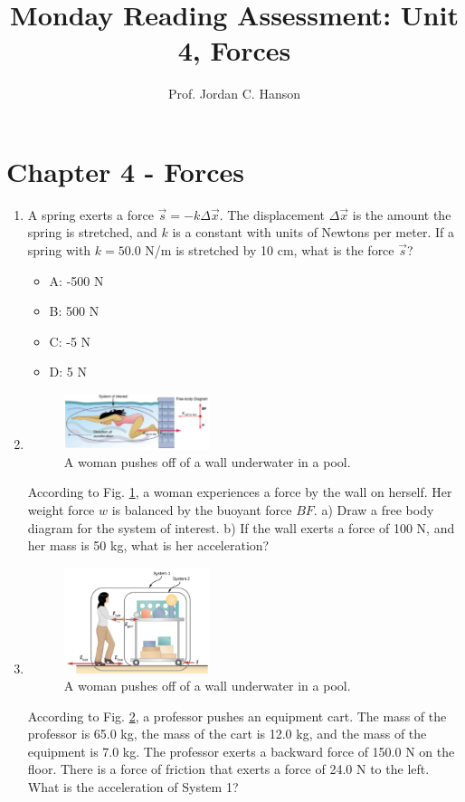 \documentclass{article}
\begin{document}
\title{Monday Reading Assessment: Unit 4, Forces}
\author{Prof. Jordan C. Hanson}

\maketitle

\section{Chapter 4 - Forces}

\begin{enumerate}
\item A spring exerts a force $\vec{s} = -k \Delta\vec{x}$.  The displacement $\Delta\vec{x}$ is the amount the spring is stretched, and $k$ is a constant with units of Newtons per meter.  If a spring with $k = 50.0$ N/m is stretched by 10 cm, what is the force $\vec{s}$?
\begin{itemize}
\item A: -500 N
\item B: 500 N
\item C: -5 N
\item D: 5 N
\end{itemize}
\item 
\begin{figure}[ht]
\centering
\includegraphics[width=0.4\textwidth,trim=0cm 0cm 4.75cm 2cm,clip=true]{wall.png}
\caption{\label{fig:wall} A woman pushes off of a wall underwater in a pool.}
\end{figure}
According to Fig. \ref{fig:wall}, a woman experiences a force by the wall on herself.  Her weight force $w$ is balanced by the buoyant force $BF$.  a) Draw a free body diagram for the system of interest.  b) If the wall exerts a force of 100 N, and her mass is 50 kg, what is her acceleration?
\item 
\begin{figure}[ht]
\centering
\includegraphics[width=0.4\textwidth]{cart.png}
\caption{\label{fig:cart} A woman pushes off of a wall underwater in a pool.}
\end{figure}
According to Fig. \ref{fig:cart}, a professor pushes an equipment cart.  The mass of the professor is 65.0 kg, the mass of the cart is 12.0 kg, and the mass of the equipment is 7.0 kg.  The professor exerts a backward force of 150.0 N on the floor.  There is a force of friction that exerts a force of 24.0 N to the left.  What is the acceleration of System 1?
\end{enumerate}
\end{document}
